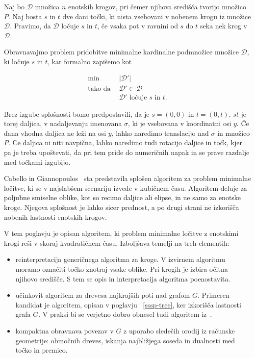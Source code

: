 \documentclass[a4paper, 12pt]{book}
\newcommand{\D}{\ensuremath{\mathcal{D}}}
\begin{document}
Naj bo $\D$ množica $n$ enotskih krogov, pri čemer njihova središča tvorijo množico $P$. Naj bosta $s$ in $t$ dve dani točki, ki nista vsebovani v nobenem krogu iz množice $\D$. Pravimo, da $\D$ ločuje $s$ in $t$, če vsaka pot v ravnini od $s$ do $t$ seka nek krog v $\D$.

Obravnavajmo problem pridobitve minimalne kardinalne podmnožice množice $\D$, ki ločuje $s$ in $t$, kar formalno zapišemo kot 

\begin{align*}
	\min ~~		& |\D'|\\
	 \mbox{tako da}~~ & \D'\subset \D\\
				&	\D'\text{ ločuje $s$ in $t$}. 
\end{align*}

Brez izgube splošnosti bomo predpostavili, da je $s=(0,0)$ in $t=(0,t)$. $st$ je torej daljica, v nadaljevanju imenovana $\sigma$, ki je vsebovana v koordinatni osi $y$. Če dana vhodna daljica ne leži na osi $y$, lahko naredimo translacijo nad $\sigma$ in množico $P$. Ce daljica ni niti navpična, lahko naredimo tudi rotacijo daljice in točk, kjer pa je treba upoštevati, da pri tem pride do numeričnih napak in se prave razdalje med točkami izgubijo. 

Cabello in Giannopoulos~\cite{CG16} sta predstavila splošen algoritem za problem minimalne ločitve, ki se v najslabšem scenariju izvede v kubičnem času. Algoritem deluje za poljubne smiselne oblike, kot so recimo daljice ali elipse, in ne samo za enotske kroge. Njegova splošnost je lahko sicer prednost, a po drugi strani ne izkorišča nobenih lastnosti enotskih krogov.

V tem poglavju je opisan algoritem, ki problem minimalne ločitve z enotskimi krogi reši v skoraj kvadratičnem času. Izboljšava temelji na treh elementih:
\begin{itemize}
\item reinterpretacija generičnega algoritma za kroge. V izvirnem algoritmu moramo označiti točko znotraj vsake oblike. Pri krogih je izbira očitna - njihovo središče. S tem se opis in interpretacija algoritma poenostavita.
\item učinkovit algoritem za drevesa najkrajših poti nad grafom $G$. Primeren kandidat je algoritem, opisan v poglavju ~\ref{sssp-tree}, ker izkorišča lastnosti grafa $G$. V praksi bi se verjetno dobro obnesel tudi algoritem iz~\cite{ChanS16}.
\item kompaktna obravnava povezav v $G$ z uporabo sledečih orodij iz računske geometrije: območnih dreves, iskanja najbližjega soseda in dualnosti med točko in premico. 
\end{itemize}
\end{document}
